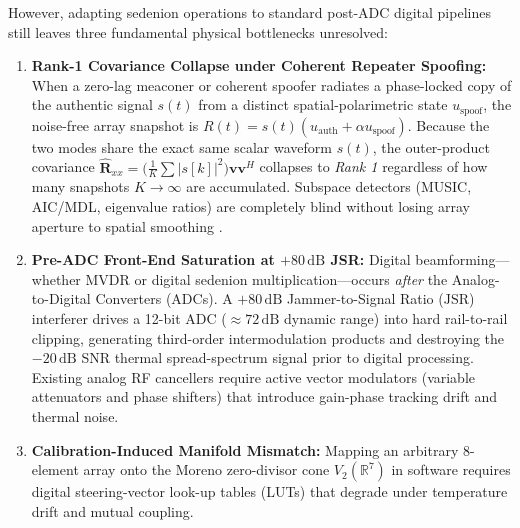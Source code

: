 \documentclass[journal,twoside]{IEEEtran}
\theoremstyle{definition}
\theoremstyle{remark}
\newcommand{\R}{\mathbb{R}}
\begin{document}
However, adapting sedenion operations to standard post-ADC digital pipelines still leaves three fundamental physical bottlenecks unresolved:
\begin{enumerate}
    \item \textbf{Rank-1 Covariance Collapse under Coherent Repeater Spoofing:} When a zero-lag meaconer or coherent spoofer radiates a phase-locked copy of the authentic signal $s(t)$ from a distinct spatial-polarimetric state $u_{\mathrm{spoof}}$, the noise-free array snapshot is $R(t) = s(t)(u_{\mathrm{auth}} + \alpha u_{\mathrm{spoof}})$. Because the two modes share the exact same scalar waveform $s(t)$, the outer-product covariance $\hat{\bm{R}}_{xx} = \bigl(\frac{1}{K}\sum |s[k]|^2\bigr)\bm{v}\bm{v}^H$ collapses to \emph{Rank 1} regardless of how many snapshots $K \to \infty$ are accumulated. Subspace detectors (MUSIC, AIC/MDL, eigenvalue ratios) are completely blind without losing array aperture to spatial smoothing \cite{Shan1985}.
    \item \textbf{Pre-ADC Front-End Saturation at $+80\,\mathrm{dB}$ JSR:} Digital beamforming—whether MVDR or digital sedenion multiplication—occurs \emph{after} the Analog-to-Digital Converters (ADCs). A $+80\,\mathrm{dB}$ Jammer-to-Signal Ratio ($\mathrm{JSR}$) interferer drives a 12-bit ADC ($\approx 72\,\mathrm{dB}$ dynamic range) into hard rail-to-rail clipping, generating third-order intermodulation products and destroying the $-20\,\mathrm{dB}$ SNR thermal spread-spectrum signal prior to digital processing. Existing analog RF cancellers require active vector modulators (variable attenuators and phase shifters) that introduce gain-phase tracking drift and thermal noise.
    \item \textbf{Calibration-Induced Manifold Mismatch:} Mapping an arbitrary 8-element array onto the Moreno zero-divisor cone $V_2(\R^7)$ in software requires digital steering-vector look-up tables (LUTs) that degrade under temperature drift and mutual coupling.
\end{enumerate}
\end{document}
